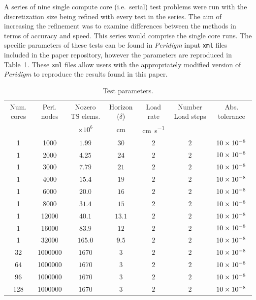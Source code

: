 \documentclass[preprint,12pt]{elsarticle}
\begin{document}
A series of nine single compute core (i.e.\ serial) test problems were run with the discretization size being refined with every test in the series. The aim of increasing the refinement was to examine differences between the methods in terms of accuracy and speed. This series would comprise the single core runs.   The specific parameters of these tests can be found in \emph{Peridigm} input {\tt xml} files included in the paper repository, however the parameters are reproduced in Table~\ref{tab:TestParams}. These {\tt xml} files allow users with the appropriately modified version of \emph{Peridigm} to reproduce the results found in this paper.
%
\begin{table}[!tbp]    
  \scriptsize
  \centering
  \caption{Test parameters.} \label{tab:TestParams}   
       \begin{tabular}{c c c c c c c}
         \toprule
				 Num. cores &Peri. nodes & Nozero TS elems. & Horizon ($\delta$) & Load rate & Number Load steps & Abs. tolerance \\ 
         &            & $\times 10^6$    & \si{\centi\meter}& \si{\centi\meter\per\second} &   &     \\
        \midrule
        1 & 1000 & $1.99$             & $30$   & $2$ & $2$ & $\num{10E-8}$ \\
        1 & 2000 & $4.25$             & $24$  & $2$ & $2$ & $\num{10E-8}$ \\
        1 & 3000 & $7.79$             & $21$  & $2$ & $2$ & $\num{10E-8}$ \\
        1 & 4000 & $15.4$             & $19$  & $2$ & $2$ & $\num{10E-8}$ \\
        1 & 6000 & $20.0$             & $16$  & $2$ & $2$ & $\num{10E-8}$ \\
        1 & 8000 & $31.4$             & $15$  & $2$ & $2$ & $\num{10E-8}$ \\
        1 & 12000 & $40.1$            & $13.1$ & $2$ & $2$ & $\num{10E-8}$ \\
        1 & 16000 & $83.9$            & $12$  & $2$ & $2$ & $\num{10E-8}$ \\
        1 & 32000 & $165.0$           & $9.5$ & $2$ & $2$ & $\num{10E-8}$ \\
        32 & 1000000 & $1670$          & $3$  & $2$ & $2$ & $\num{10E-8}$ \\
        64 & 1000000 & $1670$          & $3$  & $2$ & $2$ & $\num{10E-8}$ \\
        96 & 1000000 & $1670$          & $3$  & $2$ & $2$ & $\num{10E-8}$ \\
        128 & 1000000 & $1670$          & $3$  & $2$ & $2$ & $\num{10E-8}$ \\
        \bottomrule
    \end{tabular}
\end{table}
\end{document}
